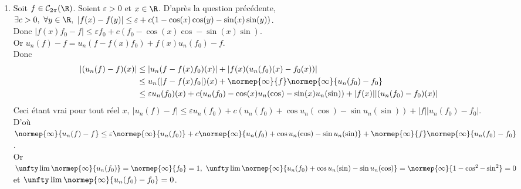 \documentclass{book}
\begin{document}
\begin{enumerate}[leftmargin=*]
\begin{center}
		\end{center}
		càd $1-\cos(x-y)\geq 1-\cos(\delta)$. Donc $|f(x)-f(y)|\leq 2\normep{\infty}{f}\leq \varepsilon+c(1-\cos(x-y))$ pour $c>\max\left(0,\dfrac{2\normep{\infty}{f}-\varepsilon}{1-\cos(\delta)}\right)>0$.
		\item Soit $f\in \mathcal C_{2\pi}(\R)$. Soient $\varepsilon>0$ et $x\in \R$. D'après la question précédente,\\
		$\exists c>0,\ \forall y\in \R,\ |f(x)-f(y)|\leq \varepsilon+c(1-\cos(x)\cos(y)-\sin(x)\sin(y))$.\\
		Donc $|f(x)f_0-f|\leq \varepsilon f_0+c(f_0-\cos(x)\cos-\sin(x)\sin)$.\\
		Or $u_n(f)-f=u_n(f-f(x)f_0)+f(x)u_n(f_0)-f$.\\
		Donc 
		\begin{align*}
			|(u_n(f)-f)(x)|&\leq |u_n(f-f(x)f_0)(x)|+|f(x)(u_n(f_0)(x)-f_0(x))|\\
			&\leq u_n(|f-f(x)f_0|)(x)+\normep{\infty}{f}\normep{\infty}{u_n(f_0)-f_0}\\
			&\leq \varepsilon u_n(f_0)(x)+c(u_n(f_0)-\cos(x)u_n(\cos)-\sin(x)u_n(\sin))+|f(x)||(u_n(f_0)-f_0)(x)|
		\end{align*}
		Ceci étant vrai pour tout réel $x,\ |u_n(f)-f|\leq \varepsilon u_n(f_0)+c(u_n(f_0)+\cos u_n(\cos)-\sin u_n(\sin))+|f||u_n(f_0)-f_0|$.\\
		D'où $\normep{\infty}{u_n(f)-f}\leq \varepsilon\normep{\infty}{u_n(f_0)}+c\normep{\infty}{u_n(f_0)+\cos u_n(\cos)-\sin u_n(\sin)}+\normep{\infty}{f}\normep{\infty}{u_n(f_0)-f_0}$.\\
		Or $\unfty\lim\normep{\infty}{u_n(f_0)}=\normep{\infty}{f_0}=1,\ \unfty\lim\normep{\infty}{u_n(f_0)+\cos u_n(\sin)-\sin u_n(\cos)}=\normep{\infty}{1-\cos^2-\sin^2}=0$ et $\unfty\lim\normep{\infty}{u_n(f_0)-f_0}=0$.\\

\end{enumerate}
\end{document}
